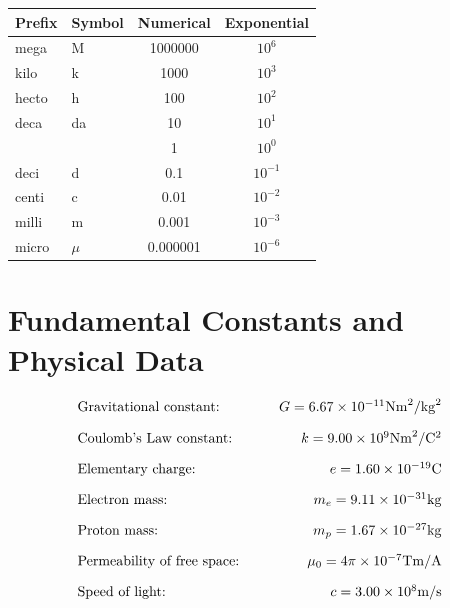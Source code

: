 \documentclass[12pt,a4paper]{article}
\begin{document}
\begin{table}[H]
\centering
\begin{tabular}{@{}llcc@{}}
\toprule
Prefix & Symbol & Numerical & Exponential \\
\midrule
mega & M & 1000000 & $10^6$ \\
kilo & k & 1000 & $10^3$ \\
hecto & h & 100 & $10^2$ \\
deca & da & 10 & $10^1$ \\
 &  & 1 & $10^0$ \\
deci & d & 0.1 & $10^{-1}$ \\
centi & c & 0.01 & $10^{-2}$ \\
milli & m & 0.001 & $10^{-3}$ \\
micro & $\mu$ & 0.000001 & $10^{-6}$ \\
\bottomrule
\end{tabular}
\end{table}

\section{Fundamental Constants and Physical Data}

\begin{align*}
  \begin{array}{l@{\hspace{1cm}}r}
    \text{Gravitational constant:} & G=6.67 \times 10^{-11} \mathrm{Nm}^2/\mathrm{kg}^2 \\[1em]
    \text{Coulomb's Law constant:} & k=9.00 \times 10^9 \mathrm{Nm}^2/\mathrm{C}^2 \\[1em]
    \text{Elementary charge:} & e=1.60 \times 10^{-19} \mathrm{C} \\[1em]
    \text{Electron mass:} & m_e=9.11 \times 10^{-31} \mathrm{kg} \\[1em]
    \text{Proton mass:} & m_p=1.67 \times 10^{-27} \mathrm{kg} \\[1em]
    \text{Permeability of free space:} & \mu_0=4\pi \times 10^{-7} \mathrm{Tm}/\mathrm{A} \\[1em]
    \text{Speed of light:} & c=3.00 \times 10^8 \mathrm{m}/\mathrm{s}
  \end{array}
\end{align*}
\end{document}
